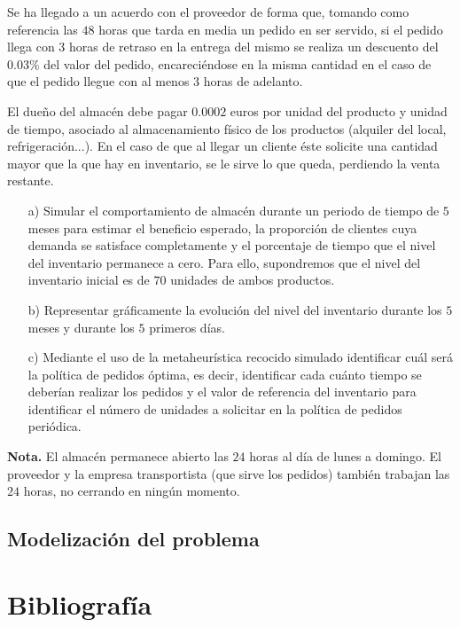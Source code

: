 \documentclass[a4paper,12pt]{article}
\begin{document}
	
	Se ha llegado a un acuerdo con el proveedor de forma que, tomando como referencia las $48$ horas que tarda en media un pedido en ser servido, si el pedido llega con $3$ horas de retraso en la entrega del mismo se realiza un descuento del $0.03\%$ del valor del pedido, encareciéndose en la misma cantidad en el caso de que el pedido llegue con al menos $3$ horas de adelanto.

	
	El dueño del almacén debe pagar $0.0002$ euros por unidad del producto y unidad de tiempo, asociado al almacenamiento físico de los productos (alquiler del local, refrigeración...). En el caso de que al llegar un cliente éste solicite una cantidad mayor que la que hay en inventario, se le sirve lo que queda, perdiendo la venta restante.

	
	\begin{enumerate}

		\item[a)] Simular el comportamiento de almacén durante un periodo de tiempo de $5$ meses para estimar el beneficio esperado, la proporción de clientes cuya demanda se satisface completamente y el porcentaje de tiempo que el nivel del inventario permanece a cero. Para ello, supondremos que el nivel del inventario inicial es de $70$ unidades de ambos productos.

		\item[b)] Representar gráficamente la evolución del nivel del inventario durante los $5$ meses y durante los $5$ primeros días. 

		\item[c)] Mediante el uso de la metaheurística recocido simulado identificar cuál será la política de pedidos óptima, es decir, identificar cada cuánto tiempo se deberían realizar los pedidos y el valor de referencia del inventario para identificar el número de unidades a solicitar en la política de pedidos periódica.

	\end{enumerate}

	
	\textbf{Nota.} El almacén permanece abierto las $24$ horas al día de lunes a domingo. El proveedor y la empresa transportista (que sirve los pedidos) también trabajan las $24$ horas, no cerrando en ningún momento.

	
	\subsection{Modelización del problema}

	
	

	
\newpage
	\section*{Bibliografía}
	
	
	
\end{document}
